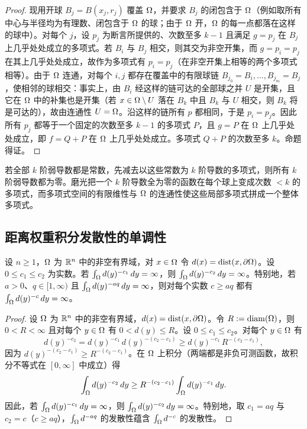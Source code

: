 \begin{proof}
现用开球 $B_j=B(x_j,r_j)$ 覆盖 $\Omega$，并要求 $B_j$ 的闭包含于 $\Omega$（例如取所有中心与半径均为有理数、闭包含于 $\Omega$ 的球；由于 $\Omega$ 开，$\Omega$ 的每一点都落在这样的球中）。对每个 $j$，设 $p_j$ 为断言所提供的、次数至多 $k-1$ 且满足 $g=p_j$ 在 $B_j$ 上几乎处处成立的多项式。若 $B_i$ 与 $B_j$ 相交，则其交为非空开集，而 $g=p_i=p_j$ 在其上几乎处处成立，故作为多项式有 $p_i=p_j$（在非空开集上相等的两个多项式相等）。由于 $\Omega$ 连通，对每个 $i,j$ 都存在覆盖中的有限球链 $B_{j_0}=B_i,\dots,B_{j_m}=B_j$，使相邻的球相交：事实上，由 $B_i$ 经这样的链可达的全部球之并 $U$ 是开集，且它在 $\Omega$ 中的补集也是开集（若 $x\in\Omega\setminus U$ 落在 $B_k$ 中且 $B_k$ 与 $U$ 相交，则 $B_k$ 将是可达的），故由连通性 $U=\Omega$。沿这样的链所有 $p$ 都相同，于是 $p_i=p_j$。因此所有 $p_j$ 都等于一个固定的次数至多 $k-1$ 的多项式 $P$，且 $g=P$ 在 $\Omega$ 上几乎处处成立，即 $f=Q+P$ 在 $\Omega$ 上几乎处处成立。多项式 $Q+P$ 的次数至多 $k$。命题得证。
\end{proof}

\begin{remark}[直觉]
若全部 $k$ 阶弱导数都是常数，先减去以这些常数为 $k$ 阶导数的多项式，则所有 $k$ 阶弱导数都为零。磨光把一个 $k$ 阶导数全为零的函数在每个球上变成次数 $<k$ 的多项式，而多项式空间的有限维性与 $\Omega$ 的连通性使这些局部多项式拼成一个整体多项式。
\end{remark}

\subsection{距离权重积分发散性的单调性}

\begin{lemma}[距离权重积分发散性的单调性]
设 $n\ge 1$，$\Omega$ 为 $\mathbb{R}^n$ 中的非空有界域，对 $x\in\Omega$ 令 $d(x)=\operatorname{dist}(x,\partial\Omega)$。设 $0\le c_1\le c_2$ 为实数。若 $\int_\Omega d(y)^{-c_1}\,dy=\infty$，则 $\int_\Omega d(y)^{-c_2}\,dy=\infty$。特别地，若 $a>0$、$q\in[1,\infty)$ 且 $\int_\Omega d(y)^{-aq}\,dy=\infty$，则对每个实数 $c\ge aq$ 都有 $\int_\Omega d(y)^{-c}\,dy=\infty$。
\end{lemma}

\begin{proof}
设 $\Omega$ 为 $\mathbb{R}^n$ 中的非空有界域，$d(x)=\operatorname{dist}(x,\partial\Omega)$。令 $R:=\operatorname{diam}(\Omega)$，则 $0<R<\infty$ 且对每个 $y\in\Omega$ 有 $0<d(y)\le R$。设 $0\le c_1\le c_2$。对每个 $y\in\Omega$ 有
\[
  d(y)^{-c_2}=d(y)^{-c_1}\,d(y)^{-(c_2-c_1)}\ge d(y)^{-c_1}\,R^{-(c_2-c_1)} ,
\]
因为 $d(y)^{-(c_2-c_1)}\ge R^{-(c_2-c_1)}$。在 $\Omega$ 上积分（两端都是非负可测函数，故积分不等式在 $[0,\infty]$ 中成立）得
\[
  \int_\Omega d(y)^{-c_2}\,dy\ge R^{-(c_2-c_1)}\int_\Omega d(y)^{-c_1}\,dy .
\]
因此，若 $\int_\Omega d(y)^{-c_1}\,dy=\infty$，则 $\int_\Omega d(y)^{-c_2}\,dy=\infty$。特别地，取 $c_1=aq$ 与 $c_2=c$（$c\ge aq$），$\int_\Omega d^{-aq}$ 的发散性蕴含 $\int_\Omega d^{-c}$ 的发散性。
\end{proof}

